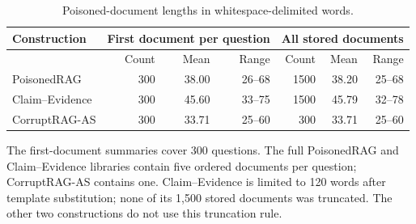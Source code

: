 \begin{table}[!htbp]
\centering
\caption{Poisoned-document lengths in whitespace-delimited words.}
\label{tab:apx_poison_lengths}
\begingroup\fontsize{9}{10.8}\selectfont
\setlength{\tabcolsep}{4.0pt}
\renewcommand{\arraystretch}{1.13}
\begin{tabular}{@{}lrrrrrr@{}}
\toprule
Construction & \multicolumn{3}{c}{First document per question} & \multicolumn{3}{c}{All stored documents} \\
\midrule
 & Count & Mean & Range & Count & Mean & Range \\
\midrule
PoisonedRAG & 300 & 38.00 & 26--68 & 1500 & 38.20 & 25--68 \\
Claim--Evidence & 300 & 45.60 & 33--75 & 1500 & 45.79 & 32--78 \\
CorruptRAG-AS & 300 & 33.71 & 25--60 & 300 & 33.71 & 25--60 \\
\bottomrule
\end{tabular}
\endgroup
\par\vspace{4pt}\begin{minipage}{\linewidth}\footnotesize The first-document summaries cover 300 questions. The full PoisonedRAG and Claim--Evidence libraries contain five ordered documents per question; CorruptRAG-AS contains one. Claim--Evidence is limited to 120 words after template substitution; none of its 1,500 stored documents was truncated. The other two constructions do not use this truncation rule.\end{minipage}
\end{table}
